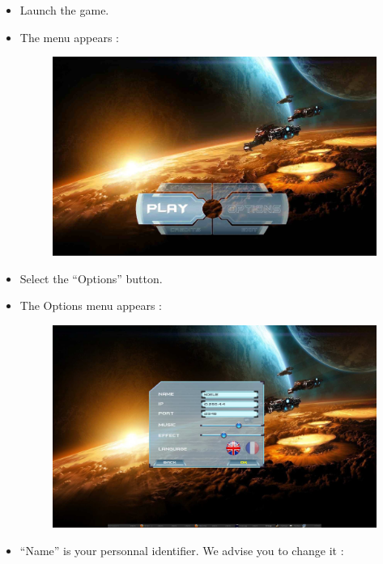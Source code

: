 \documentclass{koala-fr}
\begin{document}
\begin{itemize}
  \item Launch the game.
  \item The menu appears :
    \begin{figure}[H]
      \begin{center}
        \includegraphics[width=15cm]{menu.jpg}
      \end{center}
    \end{figure}
  \item Select the ``Options'' button.
  \item The Options menu appears :
    \begin{figure}[H]
      \begin{center}
        \includegraphics[width=15cm]{settings.jpg}
      \end{center}
    \end{figure}
  \item ``Name'' is your personnal identifier. We advise you to change it :

\end{itemize}
\end{document}
